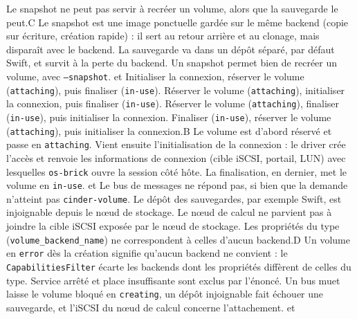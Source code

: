   {Le snapshot ne peut pas servir à recréer un volume, alors que la sauvegarde le peut.}{C}
  {Le snapshot est une image ponctuelle gardée sur le même backend (copie sur écriture, création rapide) : il sert au retour arrière et au clonage, mais disparaît avec le backend. La sauvegarde va dans un dépôt séparé, par défaut Swift, et survit à la perte du backend. Un snapshot permet bien de recréer un volume, avec \texttt{--snapshot}.}
  { et }
  {Initialiser la connexion, réserver le volume (\texttt{attaching}), puis finaliser (\texttt{in-use}).}
  {Réserver le volume (\texttt{attaching}), initialiser la connexion, puis finaliser (\texttt{in-use}).}
  {Réserver le volume (\texttt{attaching}), finaliser (\texttt{in-use}), puis initialiser la connexion.}
  {Finaliser (\texttt{in-use}), réserver le volume (\texttt{attaching}), puis initialiser la connexion.}{B}
  {Le volume est d'abord réservé et passe en \texttt{attaching}. Vient ensuite l'initialisation de la connexion : le driver crée l'accès et renvoie les informations de connexion (cible iSCSI, portail, LUN) avec lesquelles \texttt{os-brick} ouvre la session côté hôte. La finalisation, en dernier, met le volume en \texttt{in-use}.}
  { et }
  {Le bus de messages ne répond pas, si bien que la demande n'atteint pas \texttt{cinder-volume}.}
  {Le dépôt des sauvegardes, par exemple Swift, est injoignable depuis le nœud de stockage.}
  {Le nœud de calcul ne parvient pas à joindre la cible iSCSI exposée par le nœud de stockage.}
  {Les propriétés du type (\texttt{volume\_backend\_name}) ne correspondent à celles d'aucun backend.}{D}
  {Un volume en \texttt{error} dès la création signifie qu'aucun backend ne convient : le \texttt{CapabilitiesFilter} écarte les backends dont les propriétés diffèrent de celles du type. Service arrêté et place insuffisante sont exclus par l'énoncé. Un bus muet laisse le volume bloqué en \texttt{creating}, un dépôt injoignable fait échouer une sauvegarde, et l'iSCSI du nœud de calcul concerne l'attachement.}
  { et }
